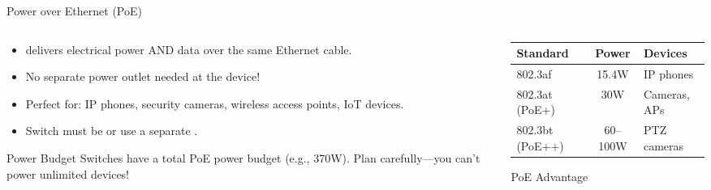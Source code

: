 \documentclass[aspectratio=169]{beamer}  %
\begin{document}
\begin{frame}{Power over Ethernet (PoE)}
    \begin{columns}[T]
        \begin{column}{0.52\textwidth}
            \begin{itemize}
                \item {} delivers electrical power AND data over the same Ethernet cable.
                \item No separate power outlet needed at the device!
                \item Perfect for: IP phones, security cameras, wireless access points, IoT devices.
                \item Switch must be  or use a separate .
            \end{itemize}
            
            \vspace{0.3em}
            \begin{alertblock}{Power Budget}
                Switches have a total PoE power budget (e.g., 370W). Plan carefully---you can't power unlimited devices!
            \end{alertblock}
        \end{column}
        \begin{column}{0.45\textwidth}
            \begin{center}
                \scriptsize
                \begin{tabular}{l c l}
                    \toprule
                    \textbf{Standard} & \textbf{Power} & \textbf{Devices} \\
                    \midrule
                    802.3af & 15.4W & IP phones \\
                    802.3at (PoE+) & 30W & Cameras, APs \\
                    802.3bt (PoE++) & 60--100W & PTZ cameras \\
                    \bottomrule
                \end{tabular}
            \end{center}
            
            \vspace{0.5em}
            \begin{block}{PoE Advantage}
                \centering
\end{block}
\end{column}
\end{columns}
\end{frame}
\end{document}
